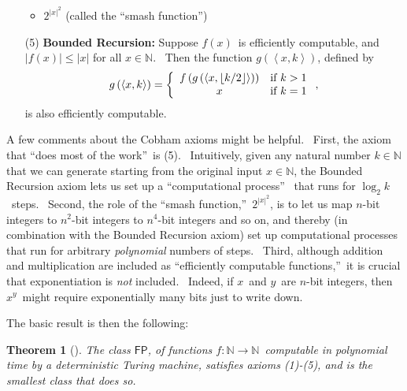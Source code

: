 \documentclass[12pt,onecolumn]{article}%
\newtheorem{theorem}{Theorem}
\begin{document}
\begin{enumerate}
\begin{itemize}
\item $2^{\left\vert x\right\vert ^{2}}$ (called the \textquotedblleft smash
function\textquotedblright)
\end{itemize}

\item[(5)] \textbf{Bounded Recursion:} Suppose $f\left(  x\right)  $\ is
efficiently computable, and $\left\vert f\left(  x\right)  \right\vert
\leq\left\vert x\right\vert $ for all $x\in\mathbb{N}$. \ Then the function
$g\left(  \left\langle x,k\right\rangle \right)  $, defined by%
\[
g\left(  \left\langle x,k\right\rangle \right)  =\left\{
\begin{array}
[c]{cc}%
f\left(  g\left(  \left\langle x,\left\lfloor k/2\right\rfloor \right\rangle
\right)  \right)  & \text{if }k>1\\
x & \text{if }k=1
\end{array}
\right.  ,
\]
is also efficiently computable.
\end{enumerate}

A few comments about the Cobham axioms might be helpful. \ First, the axiom
that \textquotedblleft does most of the work\textquotedblright\ is (5).
\ Intuitively, given any natural number $k\in\mathbb{N}$ that we can generate
starting from the original input $x\in\mathbb{N}$, the Bounded Recursion axiom
lets us set up a \textquotedblleft computational process\textquotedblright%
\ that runs for $\log_{2}k$\ steps. \ Second, the role of the
\textquotedblleft smash function,\textquotedblright\ $2^{\left\vert
x\right\vert ^{2}}$, is to let us map $n$-bit integers to $n^{2}$-bit integers
to $n^{4}$-bit integers and so on, and thereby (in combination with the
Bounded Recursion axiom) set up computational processes that run for arbitrary
\textit{polynomial} numbers of steps. \ Third, although addition and
multiplication are included as \textquotedblleft efficiently computable
functions,\textquotedblright\ it is crucial that exponentiation is
\textit{not} included. \ Indeed, if $x$\ and $y$\ are $n$-bit integers, then
$x^{y}$\ might require exponentially many bits just to write down.

The basic result is then the following:

\begin{theorem}
[\cite{cobham,rose}]\label{cobhamthm}The class $\mathsf{FP}$, of functions
$f:\mathbb{N}\rightarrow\mathbb{N}$\ computable in polynomial time by a
deterministic Turing machine, satisfies axioms (1)-(5), and is the smallest
class that does so.
\end{theorem}
\end{document}
